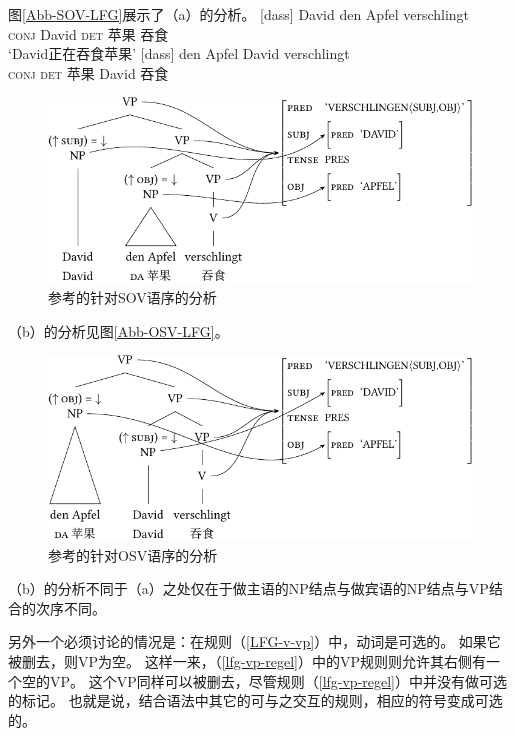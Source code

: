 \largerpage
图\vref{Abb-SOV-LFG}展示了（a）的分析。 
\eal
\ex 
\gll {}[dass] David den Apfel verschlingt\\
      \textsc{conj} David \textsc{det} 苹果 吞食\\
\glt `David正在吞食苹果'
\ex 
\gll {}[dass] den Apfel David verschlingt\\
     \textsc{conj} \textsc{det} 苹果 David 吞食 \\
\zl
\begin{figure}
\centerline{%
\includegraphics{Figures/david-den-apfel-verschlingt-lfg-lsp-crop}
}
\caption{\label{Abb-SOV-LFG}参考\citet{Berman96a-u}的针对SOV语序的分析}
\end{figure}%
（b）的分析见图\vref{Abb-OSV-LFG}。
\begin{figure}
\centerline{%
\includegraphics{Figures/den-apfel-david-verschlingt-lfg-lsp-crop}
}
\caption{\label{Abb-OSV-LFG}参考\citet{Berman96a-u}的针对OSV语序的分析}
\end{figure}%
（b）的分析不同于（a）之处仅在于做主语的NP结点与做宾语的NP结点与VP结合的次序不同。

另外一个必须讨论的情况是：在规则（\ref{LFG-v-vp}）中，动词是可选的。
如果它被删去，则VP为空。
这样一来，（\ref{lfg-vp-regel}）中的VP规则则允许其右侧有一个空的VP。
这个VP同样可以被删去，尽管规则（\ref{lfg-vp-regel}）中并没有做可选的标记。
也就是说，结合语法中其它的可与之交互的规则，相应的符号变成可选的。 

